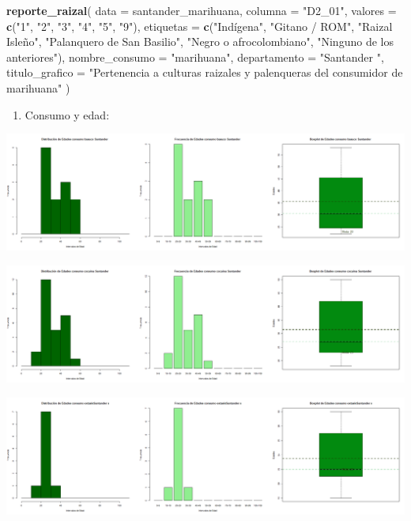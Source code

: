 \documentclass[
]{article}
\newenvironment{Shaded}{\begin{snugshade}}{\end{snugshade}}
\newcommand{\AttributeTok}[1]{\textcolor[rgb]{0.13,0.29,0.53}{#1}}
\newcommand{\FunctionTok}[1]{\textcolor[rgb]{0.13,0.29,0.53}{\textbf{#1}}}
\newcommand{\NormalTok}[1]{#1}
\newcommand{\StringTok}[1]{\textcolor[rgb]{0.31,0.60,0.02}{#1}}
\providecommand{\tightlist}{%
  \setlength{\itemsep}{0pt}\setlength{\parskip}{0pt}}
\begin{document}
\begin{Shaded}
\begin{Highlighting}[]
\FunctionTok{reporte\_raizal}\NormalTok{(}
  \AttributeTok{data =}\NormalTok{ santander\_marihuana,}
  \AttributeTok{columna =} \StringTok{"D2\_01"}\NormalTok{,}
  \AttributeTok{valores =} \FunctionTok{c}\NormalTok{(}\StringTok{"1"}\NormalTok{, }\StringTok{"2"}\NormalTok{, }\StringTok{"3"}\NormalTok{, }\StringTok{"4"}\NormalTok{, }\StringTok{"5"}\NormalTok{, }\StringTok{"9"}\NormalTok{),}
  \AttributeTok{etiquetas =} \FunctionTok{c}\NormalTok{(}\StringTok{"Indígena"}\NormalTok{, }\StringTok{"Gitano / ROM"}\NormalTok{, }\StringTok{"Raizal Isleño"}\NormalTok{, }\StringTok{"Palanquero de San Basilio"}\NormalTok{, }\StringTok{"Negro o afrocolombiano"}\NormalTok{, }\StringTok{"Ninguno de los anteriores"}\NormalTok{),}
  \AttributeTok{nombre\_consumo =} \StringTok{"marihuana"}\NormalTok{,}
  \AttributeTok{departamento =} \StringTok{"Santander "}\NormalTok{,}
  \AttributeTok{titulo\_grafico =} \StringTok{"Pertenencia a culturas raizales y palenqueras del consumidor de marihuana"}
\NormalTok{)}
\end{Highlighting}
\end{Shaded}

\begin{enumerate}
\def\labelenumi{\arabic{enumi}.}
\setcounter{enumi}{4}
\tightlist
\item
  Consumo y edad:
\end{enumerate}

\includegraphics{images/basuco edad santander.png}

\includegraphics{images/cocaina edad santander.png}

\includegraphics{images/extasis edad santander.png}
\end{document}
